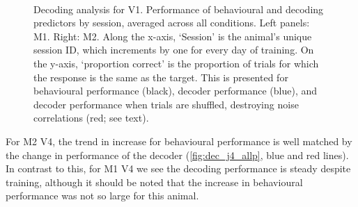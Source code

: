 \begin{figure}[htbp]
    ~~
    \caption{%
    Decoding analysis for \ac{V1}.
    Performance of behavioural and decoding predictors by session, averaged across all conditions.
    Left panels: \ac{M1}. Right: \ac{M2}.
	Along the x-axis, `Session' is the animal's unique session ID, which increments by one for every day of training.
    On the y-axis, `proportion correct' is the proportion of trials for which the response is the same as the target.
    This is presented for behavioural performance (black), decoder performance (blue), and decoder performance when trials are shuffled, destroying noise correlations (red; see text).
}
    \label{fig:dec_all_v1}
\end{figure}



For \ac{M2} \ac{V4}, the trend in increase for behavioural performance is well matched by the change in performance of the decoder (\autoref{fig:dec_j4_allp}, blue and red lines).
In contrast to this, for \ac{M1} \ac{V4} we see the decoding performance is steady despite training, although it should be noted that the increase in behavioural performance was not so large for this animal.

